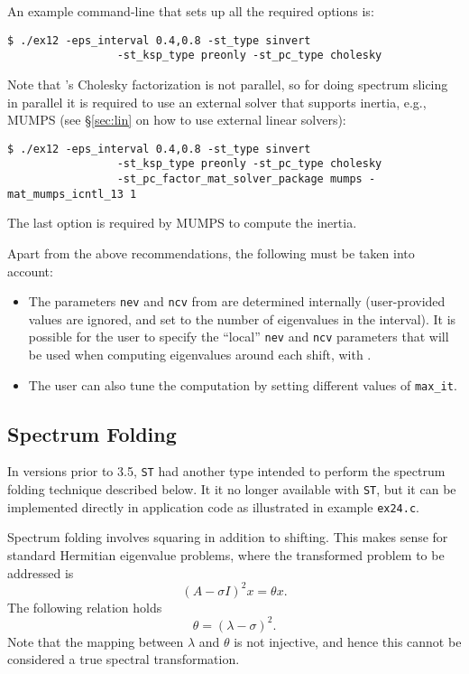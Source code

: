 An example command-line that sets up all the required options is:
\begin{Verbatim}[fontsize=\small]
	$ ./ex12 -eps_interval 0.4,0.8 -st_type sinvert
                 -st_ksp_type preonly -st_pc_type cholesky
\end{Verbatim}

Note that \petsc's Cholesky factorization is not parallel, so for doing spectrum slicing in parallel it is required to use an external solver that supports inertia, e.g., MUMPS (see \S\ref{sec:lin} on how to use external linear solvers):
\begin{Verbatim}[fontsize=\small]
	$ ./ex12 -eps_interval 0.4,0.8 -st_type sinvert
                 -st_ksp_type preonly -st_pc_type cholesky
                 -st_pc_factor_mat_solver_package mumps -mat_mumps_icntl_13 1
\end{Verbatim}
The last option is required by MUMPS to compute the inertia.

Apart from the above recommendations, the following must be taken into account:
\begin{itemize}
\setlength{\itemsep}{0pt}
\item The parameters \texttt{nev} and \texttt{ncv} from  are determined internally (user-provided values are ignored, and set to the number of eigenvalues in the interval). It is possible for the user to specify the ``local'' \texttt{nev} and \texttt{ncv} parameters that will be used when computing eigenvalues around each shift, with .
\item The user can also tune the computation by setting different values of \texttt{max\_it}.
\end{itemize}

\subsection{Spectrum Folding}

In \slepc versions prior to 3.5, \texttt{ST} had another type intended to perform the spectrum folding technique described below. It it no longer available with \texttt{ST}, but it can be implemented directly in application code as illustrated in example \texttt{ex24.c}.

Spectrum folding involves squaring in addition to shifting. This makes sense for standard Hermitian eigenvalue problems, where the transformed problem to be addressed is
\begin{equation}(A-\sigma I)^2x=\theta x.\end{equation}
The following relation holds 
\begin{equation}\theta=(\lambda-\sigma)^2.\end{equation}
Note that the mapping between $\lambda$ and $\theta$ is not injective, and hence this cannot be considered a true spectral transformation.

